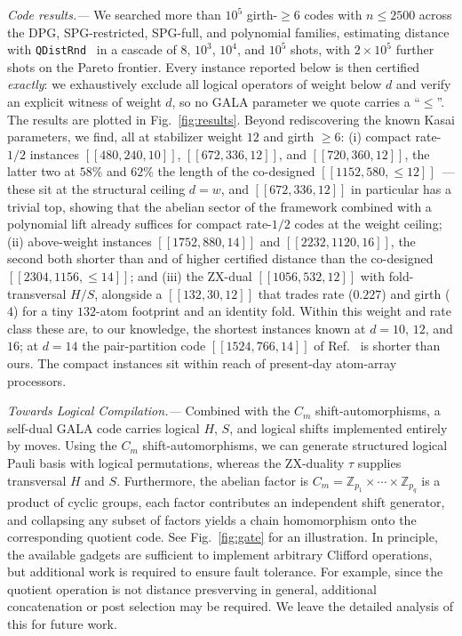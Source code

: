 \documentclass[amsmath,amssymb,twocolumn,aps,prl,superscriptaddress,nofootinbib]{revtex4-2}
\newcommand{\Z}{\mathbb{Z}}
\newcommand{\lead}[1]{\textit{#1.---}}
\theoremstyle{definition}
\begin{document}
\lead{Code results} We searched more than $10^5$ girth-$\ge6$ codes with $n\le2500$ across the DPG, SPG-restricted, SPG-full, and polynomial families, estimating distance with \texttt{QDistRnd}~\cite{Pryadko_2022} in a cascade of $8$, $10^3$, $10^4$, and $10^5$ shots, with $2\times10^5$ further shots on the Pareto frontier. Every instance reported below is then certified \emph{exactly}: we exhaustively exclude all logical operators of weight below $d$ and verify an explicit witness of weight $d$, so no GALA parameter we quote carries a ``$\le$''. The results are plotted in Fig.~\ref{fig:results}. Beyond rediscovering the known Kasai parameters, we find, all at stabilizer weight $12$ and girth $\ge6$: (i) compact rate-$1/2$ instances $[[480,240,10]]$, $[[672,336,12]]$, and $[[720,360,12]]$, the latter two at $58\%$ and $62\%$ the length of the co-designed $[[1152,580,\le12]]$~\cite{zhao2026ultrahighratequantumerrorcorrection}---these sit at the structural ceiling $d=w$, and $[[672,336,12]]$ in particular has a trivial top, showing that the abelian sector of the framework combined with a polynomial lift already suffices for compact rate-$1/2$ codes at the weight ceiling; (ii) above-weight instances $[[1752,880,14]]$ and $[[2232,1120,16]]$, the second both shorter than and of higher certified distance than the co-designed $[[2304,1156,\le14]]$; and (iii) the ZX-dual $[[1056,532,12]]$ with fold-transversal $H/S$, alongside a $[[132,30,12]]$ that trades rate ($0.227$) and girth ($4$) for a tiny $132$-atom footprint and an identity fold. Within this weight and rate class these are, to our knowledge, the shortest instances known at $d=10$, $12$, and $16$; at $d=14$ the pair-partition code $[[1524,766,14]]$ of Ref.~\cite{okada2026pairpartitionconstructionscpmbasedquantum} is shorter than ours. The compact instances sit within reach of present-day atom-array processors.

\lead{Towards Logical Compilation} Combined with the $C_m$ shift-automorphisms, a self-dual GALA code carries logical $H$, $S$, and logical shifts implemented entirely by moves. Using the $C_m$ shift-automorphisms, we can generate structured logical Pauli basis with logical permutations, whereas the ZX-duality $\tau$ supplies transversal $H$ and $S$. Furthermore, the abelian factor is $C_m=\Z_{p_1}\times\cdots\times\Z_{p_q}$ is a product of cyclic groups, each factor contributes an independent shift generator, and collapsing any subset of factors yields a chain homomorphism onto the corresponding quotient code. See Fig.~\ref{fig:gate} for an illustration.  In principle, the available gadgets are sufficient to implement arbitrary Clifford operations, but additional work is required to ensure fault tolerance. For example, since the quotient operation is not distance presverving in general, additional concatenation or post selection may be required. We leave the detailed analysis of this for future work. 
\end{document}
